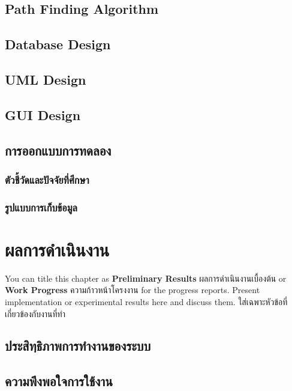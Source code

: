 \documentclass[12pt,oneside,openright,a4paper]{cpe-thai-project}
\begin{document}
\section{Path Finding Algorithm}

\section{Database Design}

\section{UML Design}

\section{GUI Design}

\section{การออกแบบการทดลอง}
\subsection{ตัวชี้วัดและปัจจัยที่ศึกษา}
\subsection{รูปแบบการเก็บข้อมูล}




\chapter{ผลการดำเนินงาน}

You can title this chapter as \textbf{Preliminary Results} ผลการดำเนินงานเบื้องต้น or \textbf{Work Progress} ความก้าวหน้าโครงงาน for the progress reports. Present implementation or experimental results here and discuss them.
ใส่เฉพาะหัวข้อที่เกี่ยวข้องกับงานที่ทำ 

\section{ประสิทฺธิภาพการทำงานของระบบ} 
\section{ความพึงพอใจการใช้งาน}
\end{document}

